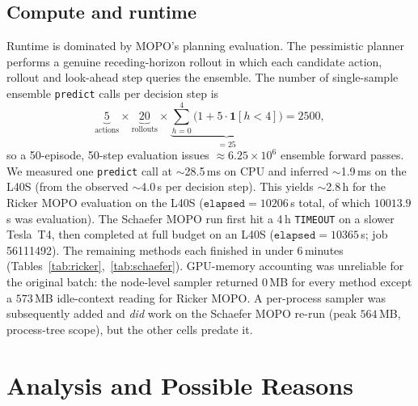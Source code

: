\documentclass[11pt]{article}
\begin{document}
\subsection{Compute and runtime}
\label{sec:compute}
Runtime is dominated by MOPO's planning evaluation. The pessimistic planner
performs a genuine receding-horizon rollout in which each candidate action,
rollout and look-ahead step queries the ensemble. The number of single-sample
ensemble \texttt{predict} calls per decision step is
\begin{equation}
  \underbrace{5}_{\text{actions}} \times \underbrace{20}_{\text{rollouts}}
  \times \underbrace{\textstyle\sum_{h=0}^{4}\big(1 + 5\cdot\mathbf{1}[h{<}4]\big)}_{=25}
  = 2500,
\end{equation}
so a 50-episode, 50-step evaluation issues $\approx 6.25\times10^6$ ensemble
forward passes. We measured one \texttt{predict} call at $\sim$28.5\,ms on CPU and
inferred $\sim$1.9\,ms on the L40S (from the observed $\sim$4.0\,s per decision
step). This yields $\sim$2.8\,h for the Ricker MOPO evaluation on the L40S
($\texttt{elapsed}=10206$\,s total, of which $10013.9$\,s was evaluation). The
Schaefer MOPO run first hit a 4\,h \texttt{TIMEOUT} on a slower Tesla~T4, then
completed at full budget on an L40S ($\texttt{elapsed}=10365$\,s; job 56111492).
The remaining methods each finished in under 6\,minutes
(Tables~\ref{tab:ricker},~\ref{tab:schaefer}). GPU-memory accounting was
unreliable for the original batch: the node-level sampler returned $0$\,MB for
every method except a $573$\,MB idle-context reading for Ricker MOPO. A
per-process sampler was subsequently added and \emph{did} work on the Schaefer
MOPO re-run (peak $564$\,MB, process-tree scope), but the other cells predate it.

\section{Analysis and Possible Reasons}
\end{document}
